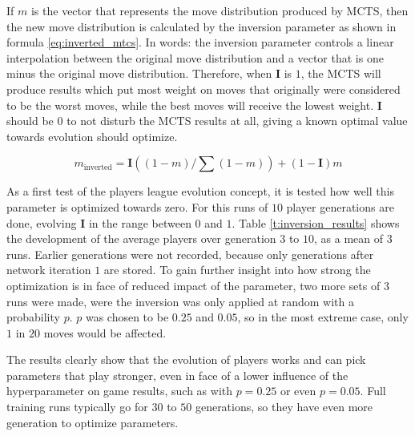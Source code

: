 \documentclass[12pt,onecolumn,oneside,titlepage]{article}
\begin{document}
If $m$ is the vector that represents the move distribution produced by MCTS, then the new move distribution is calculated by the inversion parameter as shown in formula \ref{eq:inverted_mtcs}.
In words: the inversion parameter controls a linear interpolation between the original move distribution and a vector that is one minus the original move distribution. Therefore, when $\mathbf{I}$ is $1$, the MCTS will produce results which put most weight on moves that originally
were considered to be the worst moves, while the best moves will receive the lowest weight. $\mathbf{I}$ should be $0$ to not disturb the MCTS results at all, giving a known optimal value towards evolution should optimize.

\begin{equation}
 m_\text{inverted} = \mathbf{I}((1 - m) / \sum(1 - m)) + (1 - \mathbf{I}) m \label{eq:inverted_mtcs}
\end{equation}

As a first test of the players league evolution concept, it is tested how well this parameter is optimized towards zero. For this runs of $10$ player generations are done, evolving $\mathbf{I}$ in the range between $0$ and $1$.
Table \ref{t:inversion_results} shows the development of the average players over generation $3$ to $10$, as a mean of $3$ runs. Earlier generations were not recorded, because only generations after network iteration $1$ are stored.
To gain further insight into how strong the optimization is in face of reduced impact of the parameter, two more sets of $3$ runs were made, were the inversion was only applied at random with a probability $p$. $p$ was chosen to be $0.25$ and $0.05$, so in the most extreme case,
only $1$ in $20$ moves would be affected.

The results clearly show that the evolution of players works and can pick parameters that play stronger, even in face of a lower influence of the hyperparameter on game results, such as with $p = 0.25$ or even $p = 0.05$.
Full training runs typically go for $30$ to $50$ generations, so they have even more generation to optimize parameters.
\end{document}

